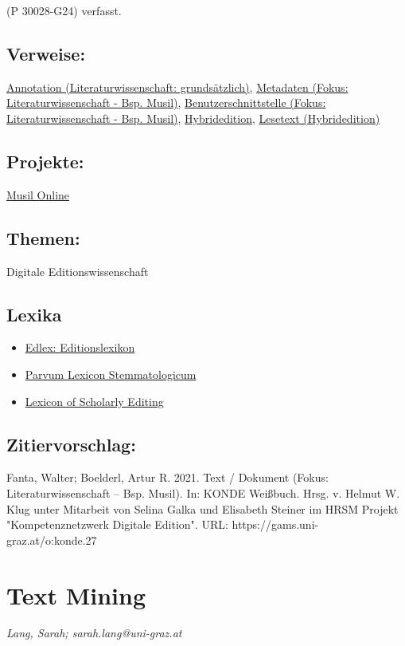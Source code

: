 \documentclass{article}
\begin{document}
                  (P 30028-G24) verfasst.\subsection*{Verweise:}\href{https://gams.uni-graz.at/o:konde.17}{Annotation (Literaturwissenschaft:
                           grundsätzlich)}, \href{https://gams.uni-graz.at/o:konde.25}{Metadaten (Fokus:
                           Literaturwissenschaft - Bsp. Musil)}, \href{https://gams.uni-graz.at/o:konde.18}{Benutzerschnittstelle (Fokus:
                           Literaturwissenschaft - Bsp. Musil)}, \href{https://gams.uni-graz.at/o:konde.96}{Hybridedition}, \href{https://gams.uni-graz.at/o:konde.22}{Lesetext (Hybridedition)}\subsection*{Projekte:}\href{http://musilonline.at}{Musil Online}\subsection*{Themen:}Digitale Editionswissenschaft\subsection*{Lexika}\begin{itemize}\item \href{https://edlex.de/index.php?title=Text}{Edlex: Editionslexikon}\item \href{https://wiki.helsinki.fi/display/stemmatology/Text}{Parvum Lexicon Stemmatologicum}\item \href{https://lexiconse.uantwerpen.be/index.php/lexicon/text/}{Lexicon of Scholarly Editing}\end{itemize}\subsection*{Zitiervorschlag:}Fanta, Walter; Boelderl, Artur R. 2021. Text / Dokument (Fokus: Literaturwissenschaft – Bsp. Musil). In: KONDE Weißbuch. Hrsg. v. Helmut W. Klug unter Mitarbeit von Selina Galka und Elisabeth Steiner im HRSM Projekt "Kompetenznetzwerk Digitale Edition". URL: https://gams.uni-graz.at/o:konde.27\newpage\section*{Text Mining} \emph{Lang, Sarah; sarah.lang@uni-graz.at }\\
        
\end{document}
